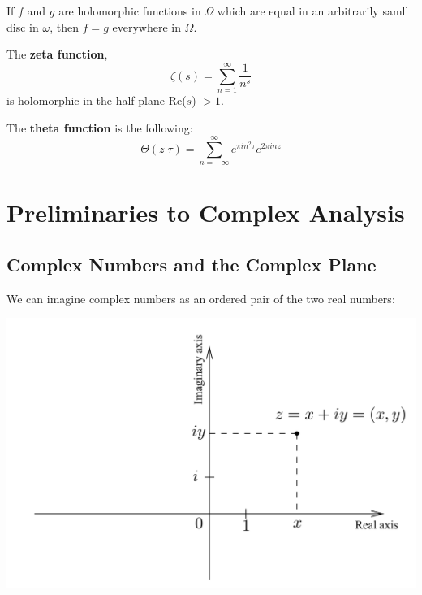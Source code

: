 \documentclass[12pt]{article}
\begin{document}
\begin{fact}
  If $f$ and $g$ are holomorphic functions in $\Omega$ which are equal in an arbitrarily samll disc in 
  $\omega$, then $f=g$ everywhere in $\Omega$.
\end{fact}

\begin{definition}
  The \textbf{zeta function},
  \begin{equation*}
    \zeta (s)=\sum^{\infty}_{n=1} \frac{1}{n^s}
  \end{equation*}
  is holomorphic in the half-plane Re($s$) $> 1$.
\end{definition}

\begin{definition}
  The \textbf{theta function} is the following:
  \begin{equation*}
    \Theta (z \vert \tau) = \sum^{\infty}_{n=-\infty} e^{\pi i n^2 \tau}e^{2\pi i n z}
  \end{equation*}
\end{definition}

\section{Preliminaries to Complex Analysis}

\subsection{Complex Numbers and the Complex Plane}

We can imagine complex numbers as an ordered pair of the two real numbers:
  
\par \begin{center} \includegraphics[scale=.2]{1-1.png} \end{center}
\end{document}
